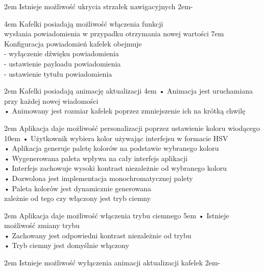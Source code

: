 {2em}{
    Istnieje możliwość ukrycia strzałek nawigacyjnych
}
{2em}{-}

{4em}{
    Kafelki posiadają możliwość włączenia funkcji\\
    wysłania powiadomienia w przypadku otrzymania nowej wartości
}
{7em}{
    Konfiguracja powiadomień kafelek obejmuje\\
    - wyłączenie dźwięku powiadomienia\\
    - ustawienie payloadu powiadomienia\\
    - ustawienie tytułu powiadomienia
}

{2em}{
    Kafelki posiadają animację aktualizacji
}
{4em}{
    • Animacja jest uruchamiana przy każdej nowej wiadomości\\
    • Animowany jest rozmiar kafelek poprzez zmniejszenie ich na krótką chwilę
}

{2em}{
    Aplikacja daje możliwość personalizacji poprzez ustawienie koloru wiodącego
}
{10em}{
    • Użytkownik wybiera kolor używając interfejsu w formacie HSV\\
    • Aplikacja generuje paletę kolorów na podstawie wybranego koloru\\
    • Wygenerowana paleta wpływa na cały interfejs aplikacji\\
    • Interfejs zachowuje wysoki kontrast niezależnie od wybranego koloru\\
    • Dozwolona jest implementacja monochromatycznej palety\\
    • Paleta kolorów jest dynamicznie generowana\\
    \hspace*{0.5em} zależnie od tego czy włączony jest tryb ciemny
}

{2em}{
    Aplikacja daje możliwość włączenia trybu ciemnego
}
{5em}{
    • Istnieje możliwość zmiany trybu\\
    • Zachowany jest odpowiedni kontrast niezależnie od trybu\\
    • Tryb ciemny jest domyślnie włączony
}

{2em}{
    Istnieje możliwość wyłączenia animacji aktualizacji kafelek
}
{2em}{-}


